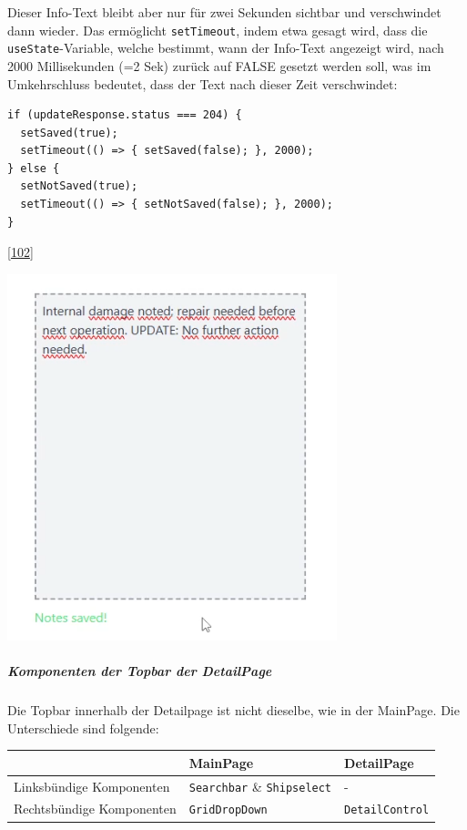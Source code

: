 \documentclass[
    headings=optiontotocandhead,%
    twoside,
    numbers=noenddot,%
    12pt, %
    titlepage, %
    parskip=full, %
    listof=leveldown, 
    numbers=noenddot, %
    a4paper,DIV=14,
    BCOR=15mm,
]{scrbook}
\newcommand{\passthrough}[1]{#1}
\let\origfigure=\figure
\let\endorigfigure=\endfigure
\renewenvironment{figure}[1][]{%
   \origfigure[H]
}{%
   \endorigfigure
}
\begin{document}
Dieser Info-Text bleibt aber nur für zwei Sekunden sichtbar und
verschwindet dann wieder. Das ermöglicht
\passthrough{\lstinline!setTimeout!}, indem etwa gesagt wird, dass die
\passthrough{\lstinline!useState!}-Variable, welche bestimmt, wann der
Info-Text angezeigt wird, nach 2000 Millisekunden (=2 Sek) zurück auf
FALSE gesetzt werden soll, was im Umkehrschluss bedeutet, dass der Text
nach dieser Zeit verschwindet:

\begin{lstlisting}[caption={Verwendung von setTimeout}]
if (updateResponse.status === 204) {
  setSaved(true);
  setTimeout(() => { setSaved(false); }, 2000);
} else {
  setNotSaved(true);
  setTimeout(() => { setNotSaved(false); }, 2000);
}
\end{lstlisting}

{[}\protect\hyperlink{ref-FreeCodeCamp-setTimeOut}{102}{]}

\begin{figure}
\centering
\includegraphics{img/Gekle/UpdatedNotes.png}
\caption{Notizen mit erfolgreicher Update-Benachrichtigung}
\end{figure}

\hypertarget{komponenten-der-topbar-der-detailpage}{%
\subparagraph{Komponenten der Topbar der
DetailPage}\label{komponenten-der-topbar-der-detailpage}}

Die Topbar innerhalb der Detailpage ist nicht dieselbe, wie in der
MainPage. Die Unterschiede sind folgende:

\begin{longtable}[]{@{}lll@{}}
\toprule
& MainPage & DetailPage\tabularnewline
\midrule
\endhead
Linksbündige Komponenten & \passthrough{\lstinline!Searchbar!} \&
\passthrough{\lstinline!Shipselect!} & -\tabularnewline
Rechtsbündige Komponenten & \passthrough{\lstinline!GridDropDown!} &
\passthrough{\lstinline!DetailControl!}\tabularnewline
\bottomrule
\end{longtable}
\end{document}
